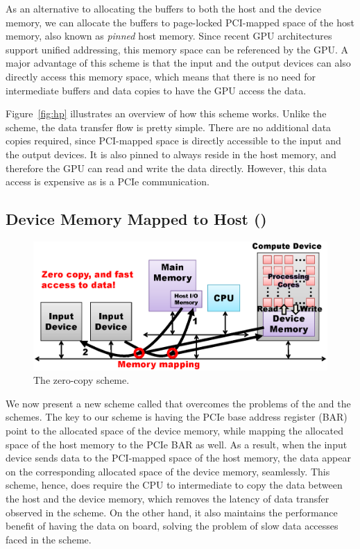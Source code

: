 As an alternative to allocating the buffers to both the host and the
device memory, we can allocate the buffers to page-locked PCI-mapped
space of the host memory, also known as \textit{pinned} host memory.
Since recent GPU architectures support unified addressing, this memory
space can be referenced by the GPU.
A major advantage of this scheme is that the input and the output
devices can also directly access this memory space, which means that
there is no need for intermediate buffers and data copies to have the
GPU access the data.

Figure~\ref{fig:hp} illustrates an overview of how this scheme works.
Unlike the {\hd} scheme, the data transfer flow is pretty simple.
There are no additional data copies required, since PCI-mapped space is
directly accessible to the input and the output devices.
It is also pinned to always reside in the host memory, and therefore the
GPU can read and write the data directly.
However, this data access is expensive as is a PCIe communication.

\subsection{Device Memory Mapped to Host ({\dm})}
\label{sec:dm}

\begin{figure}[!t]
 \centering
 \includegraphics[width=\hsize]{eps/dm.eps}
 \caption{The zero-copy {\dm} scheme.}
 \label{fig:dm}
\end{figure}

We now present a new scheme called {\dm} that overcomes the
problems of the {\hd} and the {\hp} schemes.
The key to our scheme is having the PCIe base address register
(BAR) point to the allocated space of the device memory, while mapping
the allocated space of the host memory to the PCIe BAR as well.
As a result, when the input device sends data to the PCI-mapped space of
the host memory, the data appear on the corresponding allocated space of
the device memory, seamlessly.
This scheme, hence, does require the CPU to intermediate to copy the
data between the host and the device memory, which removes the latency
of data transfer observed in the {\hd} scheme.
On the other hand, it also maintains the performance benefit of having
the data on board, solving the problem of slow data accesses faced in
the {\hp} scheme.

